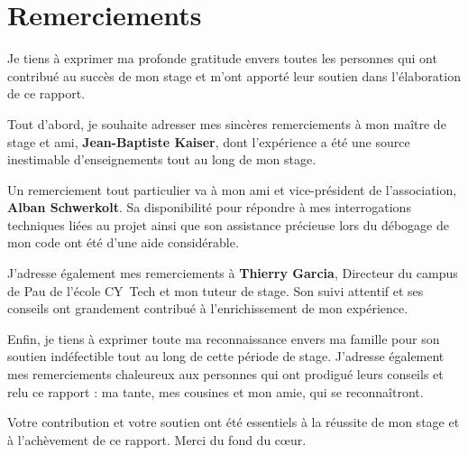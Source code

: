 \section*{Remerciements}

Je tiens à exprimer ma profonde gratitude envers toutes les personnes qui ont contribué au succès de mon stage et m'ont apporté leur soutien dans l'élaboration de ce rapport.

\medskip

Tout d'abord, je souhaite adresser mes sincères remerciements à mon maître de stage et ami, \textbf{Jean-Baptiste Kaiser}, dont l'expérience a été une source inestimable d'enseignements tout au long de mon stage.

\medskip

Un remerciement tout particulier va à mon ami et vice-président de l'association, \textbf{Alban Schwerkolt}. Sa disponibilité pour répondre à mes interrogations techniques liées au projet ainsi que son assistance précieuse lors du débogage de mon code ont été d'une aide considérable.

\medskip

J'adresse également mes remerciements à \textbf{Thierry Garcia}, Directeur du campus de Pau de l'école CY~Tech et mon tuteur de stage. Son suivi attentif et ses conseils ont grandement contribué à l'enrichissement de mon expérience.

\medskip

Enfin, je tiens à exprimer toute ma reconnaissance envers ma famille pour son soutien indéfectible tout au long de cette période de stage. J'adresse également mes remerciements chaleureux aux personnes qui ont prodigué leurs conseils et relu ce rapport : ma tante, mes cousines et mon amie, qui se reconnaîtront.

\bigskip

Votre contribution et votre soutien ont été essentiels à la réussite de mon stage et à l'achèvement de ce rapport. Merci du fond du cœur.